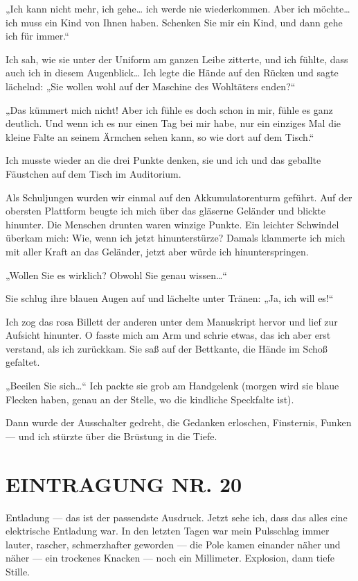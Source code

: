 „Ich kann nicht mehr, ich gehe\ldots{} ich werde nie wiederkommen. Aber
ich möchte\ldots{} ich muss ein Kind von Ihnen haben. Schenken Sie mir
ein Kind, und dann gehe ich für immer.“

Ich sah, wie sie unter der Uniform am ganzen Leibe
zitterte, und ich fühlte, dass auch ich in diesem Augenblick\ldots{} Ich
legte die Hände auf den Rücken und sagte lächelnd: „Sie wollen wohl
auf der Maschine des Wohltäters enden?“

„Das kümmert mich nicht! Aber ich fühle es doch schon in mir, fühle
es ganz deutlich. Und wenn ich es nur einen Tag bei mir habe, nur
ein einziges Mal die kleine Falte an seinem Ärmchen sehen kann, so
wie dort auf dem Tisch.“

Ich musste wieder an die drei Punkte denken, sie und ich und das
geballte Fäustchen auf dem Tisch im Auditorium.

Als Schuljungen wurden wir einmal auf den Akkumulatorenturm
geführt. Auf der obersten Plattform beugte ich mich über das
gläserne Geländer und blickte hinunter. Die Menschen drunten waren
winzige Punkte. Ein leichter Schwindel überkam mich: Wie, wenn ich
jetzt hinunterstürze? Damals klammerte ich mich mit aller Kraft an
das Geländer, jetzt aber würde ich hinunterspringen.

„Wollen Sie es wirklich? Obwohl Sie genau wissen\ldots{}“

Sie schlug ihre blauen Augen auf und lächelte unter Tränen: „Ja, ich will es!“

Ich zog das rosa Billett der anderen unter dem Manuskript hervor
und lief zur Aufsicht hinunter. O fasste mich am Arm und schrie
etwas, das ich aber erst verstand, als ich zurückkam. Sie saß auf
der Bettkante, die Hände im Schoß gefaltet.

„Beeilen Sie sich\ldots{}“ Ich packte sie grob am Handgelenk (morgen
wird sie blaue Flecken haben, genau an der Stelle, wo die kindliche
Speckfalte ist).

Dann wurde der Ausschalter gedreht, die Gedanken
erloschen, Finsternis, Funken — und ich stürzte über die Brüstung
in die Tiefe.

\section{EINTRAGUNG NR. 20}

Entladung — das ist der passendste Ausdruck. Jetzt sehe ich, dass
das alles eine elektrische Entladung war. In den letzten Tagen war
mein Pulsschlag immer lauter, rascher, schmerzhafter geworden — die
Pole kamen einander näher und näher — ein trockenes Knacken — noch
ein Millimeter. Explosion, dann tiefe Stille.

